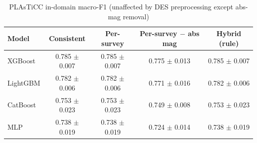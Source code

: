 \begin{table}
\centering
\caption{PLAsTiCC in-domain macro-F1 (unaffected by DES preprocessing except abs-mag removal)}
\begin{tabular}{lcccc}
\hline
Model & Consistent & Per-survey & Per-survey $-$ abs mag & Hybrid (rule) \\
\hline
XGBoost & 0.785 $\pm$ 0.007 & 0.785 $\pm$ 0.007 & 0.775 $\pm$ 0.013 & 0.785 $\pm$ 0.007 \\
LightGBM & 0.782 $\pm$ 0.006 & 0.782 $\pm$ 0.006 & 0.771 $\pm$ 0.016 & 0.782 $\pm$ 0.006 \\
CatBoost & 0.753 $\pm$ 0.023 & 0.753 $\pm$ 0.023 & 0.749 $\pm$ 0.008 & 0.753 $\pm$ 0.023 \\
MLP & 0.738 $\pm$ 0.019 & 0.738 $\pm$ 0.019 & 0.724 $\pm$ 0.014 & 0.738 $\pm$ 0.019 \\
\hline
\end{tabular}
\end{table}
